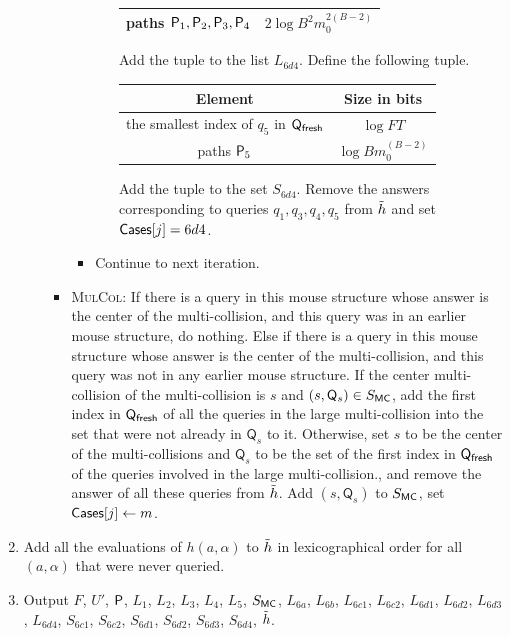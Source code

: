 \begin{enumerate}
\begin{enumerate}
\begin{itemize}
\begin{itemize}
\begin{enumerate}
\begin{center}
\begin{tabular}{|c|c|}
    paths $\pth_1,\pth_2,\pth_3,\pth_4$ & $ 2\log B^2m_0^{2(B-2)}$\\\hline
    
    \end{tabular}
    \end{center}
  Add the tuple to the list $L_{6d4}$. Define the following tuple.
  \begin{center}
    \begin{tabular}{|c|c|}\hline

    Element & Size in bits \\ \hline\hline

    the smallest index  of $q_5$ in $\qf$ & $\log FT$   \\\hline
            
    paths $\pth_5$ & $ \log Bm_0^{(B-2)}$\\\hline
    
    \end{tabular}
    \end{center}
  Add the tuple to the set $S_{6d4}$.
  Remove the answers corresponding to queries $q_1,q_3,q_4,q_5$ from $\hrest$ and set $\cs[j]=6d4$.
  \end{enumerate}
  \item Continue to next iteration.
  \end{itemize}
  \item {\textsc{MulCol}}: If there is a query in this mouse structure whose answer is the center of the multi-collision, and this query was in an earlier mouse structure, do nothing. Else if there is a query in this mouse structure whose answer is the center of the multi-collision, and this query was not in any earlier mouse structure. If the center multi-collision of the multi-collision is $s$ and $(s,\mathsf{Q}_s)\in \mcset$, add the first index in $\qf$ of all the queries in the large multi-collision into the set that were not already in $\mathsf{Q}_s$ to it. Otherwise, set $s$ to be the center of the multi-collisions and $\mathsf{Q}_s$ to be the set of the first index in $\qf$ of the queries involved in the large multi-collision., and remove the answer of all these queries from $\hrest$. Add $(s,\mathsf{Q}_s)$ to $\mcset$, set $\cs[j]\gets m$.
  \end{itemize}
\end{enumerate}
\item Add all the evaluations of $h(a,\alpha)$ to $\hrest$ in lexicographical order for all $(a,\alpha)$ that were never queried.
\item Output $F$, $U'$, $\mathsf{P}$, $L_{1}$, $L_2$, $L_3$, $L_4$, $L_5$, $\mcset$, $L_{6a}$, $L_{6b}$, $L_{6c1}$, $L_{6c2}$, $L_{6d1}$, $L_{6d2}$, $L_{6d3}$, $L_{6d4}$, $S_{6c1}$, $S_{6c2}$, $S_{6d1}$, $S_{6d2}$, $S_{6d3}$, $S_{6d4}$, $\hrest$.
\end{enumerate}

